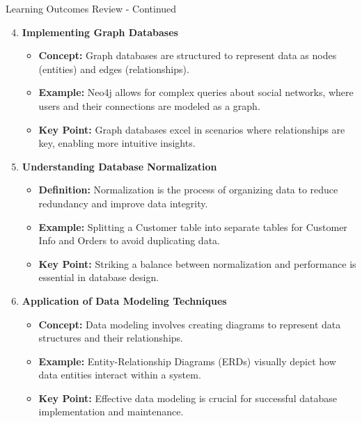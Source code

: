 \documentclass[aspectratio=169]{beamer}
\begin{document}
\begin{frame}[fragile]{Learning Outcomes Review - Continued}
    \begin{enumerate}
        \setcounter{enumi}{3}  %
        \item \textbf{Implementing Graph Databases}
            \begin{itemize}
                \item \textbf{Concept:} Graph databases are structured to represent data as nodes (entities) and edges (relationships).
                \item \textbf{Example:} Neo4j allows for complex queries about social networks, where users and their connections are modeled as a graph.
                \item \textbf{Key Point:} Graph databases excel in scenarios where relationships are key, enabling more intuitive insights.
            \end{itemize}

        \item \textbf{Understanding Database Normalization}
            \begin{itemize}
                \item \textbf{Definition:} Normalization is the process of organizing data to reduce redundancy and improve data integrity.
                \item \textbf{Example:} Splitting a Customer table into separate tables for Customer Info and Orders to avoid duplicating data.
                \item \textbf{Key Point:} Striking a balance between normalization and performance is essential in database design.
            \end{itemize}

        \item \textbf{Application of Data Modeling Techniques}
            \begin{itemize}
                \item \textbf{Concept:} Data modeling involves creating diagrams to represent data structures and their relationships.
                \item \textbf{Example:} Entity-Relationship Diagrams (ERDs) visually depict how data entities interact within a system.
                \item \textbf{Key Point:} Effective data modeling is crucial for successful database implementation and maintenance.
            \end{itemize}
    \end{enumerate}

\end{frame}
\end{document}
